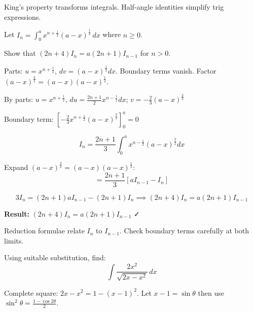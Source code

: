 \begin{takeaways}
King's property transforms integrals. Half-angle identities simplify trig expressions.
\end{takeaways}

\vspace{1cm}

\begin{problem}
Let $I_n = \int_0^a x^{n+\frac{1}{2}} (a-x)^{\frac{1}{2}} \, dx$ where $n \ge 0$.

Show that $(2n+4)I_n = a(2n+1)I_{n-1}$ for $n > 0$.
\end{problem}

\begin{hint}
Parts: $u = x^{n+\frac{1}{2}}$, $dv = (a-x)^{\frac{1}{2}}dx$. Boundary terms vanish. Factor $(a-x)^{\frac{3}{2}} = (a-x)(a-x)^{\frac{1}{2}}$.
\end{hint}

\begin{solution}
By parts: $u = x^{n+\frac{1}{2}}$, $du = \frac{2n+1}{2}x^{n-\frac{1}{2}}dx$; $v = -\frac{2}{3}(a-x)^{\frac{3}{2}}$

Boundary term: $\left[-\frac{2}{3}x^{n+\frac{1}{2}}(a-x)^{\frac{3}{2}}\right]_0^a = 0$

\[
I_n = \frac{2n+1}{3}\int_0^a x^{n-\frac{1}{2}}(a-x)^{\frac{3}{2}} dx
\]

Expand $(a-x)^{\frac{3}{2}} = (a-x)(a-x)^{\frac{1}{2}}$:
\[
= \frac{2n+1}{3}[aI_{n-1} - I_n]
\]

\[
3I_n = (2n+1)aI_{n-1} - (2n+1)I_n \implies (2n+4)I_n = a(2n+1)I_{n-1}
\]

\textbf{Result:} $\boxed{(2n+4)I_n = a(2n+1)I_{n-1}}$ ✓
\end{solution}

\begin{takeaways}
Reduction formulae relate $I_n$ to $I_{n-1}$. Check boundary terms carefully at both limits.
\end{takeaways}

\vspace{1cm}

\begin{problem}
Using suitable substitution, find:
\[
\int \frac{2x^2}{\sqrt{2x - x^2}} \, dx
\]
\end{problem}

\begin{hint}
Complete square: $2x-x^2 = 1-(x-1)^2$. Let $x-1 = \sin\theta$ then use $\sin^2\theta = \frac{1-\cos 2\theta}{2}$.
\end{hint}

